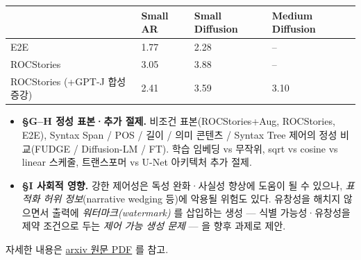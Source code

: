 \documentclass[
]{article}
\providecommand{\tightlist}{%
  \setlength{\itemsep}{0pt}\setlength{\parskip}{0pt}}
\begin{document}
\begin{longtable}[]{@{}llll@{}}
\toprule()
& Small AR & Small Diffusion & Medium Diffusion \\
\midrule()
\endhead
E2E & 1.77 & 2.28 & -- \\
ROCStories & 3.05 & 3.88 & -- \\
ROCStories (+GPT-J 합성 증강) & 2.41 & 3.59 & 3.10 \\
\bottomrule()
\end{longtable}

\begin{itemize}
\tightlist
\item
  \textbf{§G--H 정성 표본·추가 절제.} 비조건 표본(ROCStories+Aug,
  ROCStories, E2E), Syntax Span / POS / 길이 / 의미 콘텐츠 / Syntax Tree
  제어의 정성 비교(FUDGE / Diffusion-LM / FT). 학습 임베딩 vs 무작위,
  sqrt vs cosine vs linear 스케줄, 트랜스포머 vs U-Net 아키텍처 추가
  절제.
\item
  \textbf{§I 사회적 영향.} 강한 제어성은 독성 완화·사실성 향상에 도움이
  될 수 있으나, \emph{표적화 허위 정보}(narrative wedging 등)에 악용될
  위험도 있다. 유창성을 해치지 않으면서 출력에
  \emph{워터마크(watermark)} 를 삽입하는 생성 --- 식별 가능성·유창성을
  제약 조건으로 두는 \emph{제어 가능 생성 문제} --- 을 향후 과제로 제안.
\end{itemize}

자세한 내용은
\href{https://yoon-gu.github.io/compendium/papers/diffusion-lm-controllable-original.pdf}{arxiv
원문 PDF} 를 참고.
\end{document}
